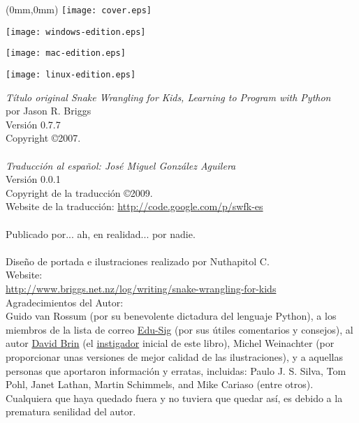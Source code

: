 \pagestyle{empty}
\frontmatter
\begin{FRONTCOVER}
\begin{titlepage}
\begin{textblock*}{210mm}(0mm,0mm)
   \texttt{[image: cover.eps]}
\end{textblock*}
\begin{flushleft}
\begin{WINDOWS}
\texttt{[image: windows-edition.eps]} 
\end{WINDOWS}
\begin{MAC}
\texttt{[image: mac-edition.eps]} 
\end{MAC}
\begin{LINUX}
\texttt{[image: linux-edition.eps]} 
\end{LINUX}
\end{flushleft}
\end{titlepage}
\end{FRONTCOVER}

\noindent
\textsf{\emph{Título original Snake Wrangling for Kids, Learning to Program with Python}}\\
por Jason R. Briggs\\
Versión 0.7.7
\\
Copyright \copyright 2007.\\
\\
\textsf{\emph{Traducción al español: José Miguel González Aguilera}}\\
Versión 0.0.1
\\
Copyright de la traducción \copyright 2009.\\
Website de la traducción: \href{http://code.google.com/p/swfk-es}{http://code.google.com/p/swfk-es}\\
\\
Publicado por... ah, en realidad... por nadie.\\
\\
Diseño de portada e ilustraciones realizado por Nuthapitol C.\\
\linebreak 
\noindent
Website:\\ \href{http://www.briggs.net.nz/log/writing/snake-wrangling-for-kids}{http://www.briggs.net.nz/log/writing/snake-wrangling-for-kids}\\ 

\noindent
Agradecimientos del Autor:\\
Guido van Rossum (por su benevolente dictadura del lenguaje Python), a los miembros de la lista de correo \href{http://www.python.org/community/sigs/current/edu-sig/}{Edu-Sig} (por sus útiles comentarios y consejos), al autor \href{http://www.davidbrin.com/}{David Brin} (el \href{http://www.salon.com/tech/feature/2006/09/14/basic/}{instigador} inicial de este libro), Michel Weinachter (por proporcionar unas versiones de mejor calidad de las ilustraciones), y a aquellas personas que aportaron información y erratas, incluidas: Paulo J. S. Silva, Tom Pohl, Janet Lathan, Martin Schimmels, and Mike Cariaso (entre otros).  Cualquiera que haya quedado fuera y no tuviera que quedar así, es debido a la prematura senilidad del autor.\\

